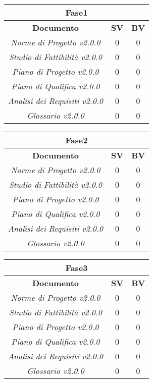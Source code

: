 \begin{center}

\begin{tabular}{|c|c|c|}
\toprule
\multicolumn{3}{c}{\textbf{Fase1}} \\
\hline
\textbf{Documento} & \textbf{SV} & \textbf{BV} \\ 
\hline
\textit{Norme di Progetto v2.0.0} & 0 & 0 \\ 
\textit{Studio di Fattibilità v2.0.0} & 0 & 0 \\ 
\textit{Piano di Progetto v2.0.0} & 0 & 0 \\ 
\textit{Piano di Qualifica v2.0.0} & 0 & 0 \\ 
\textit{Analisi dei Requisiti v2.0.0} & 0 & 0 \\ 
\textit{Glossario v2.0.0} & 0 & 0 \\ 
\hline
\end{tabular}
\end{center}
\vspace{3mm}
\begin{center}
\begin{tabular}{|c|c|c|}
\toprule
\multicolumn{3}{c}{\textbf{Fase2}} \\
\hline 
\textbf{Documento} & \textbf{SV} & \textbf{BV} \\ 
\hline
\textit{Norme di Progetto v2.0.0} & 0 & 0 \\ 
\textit{Studio di Fattibilità v2.0.0} & 0 & 0 \\ 
\textit{Piano di Progetto v2.0.0} & 0 & 0 \\ 
\textit{Piano di Qualifica v2.0.0} & 0 & 0 \\ 
\textit{Analisi dei Requisiti v2.0.0} & 0 & 0 \\ 
\textit{Glossario v2.0.0} & 0 & 0 \\ 
\hline
\end{tabular}
\end{center}
\vspace{3mm}
\begin{center}
\begin{tabular}{|c|c|c|}
\toprule
\multicolumn{3}{c}{\textbf{Fase3}} \\
\hline
\textbf{Documento} & \textbf{SV} & \textbf{BV} \\ 
\hline
\textit{Norme di Progetto v2.0.0} & 0 & 0 \\ 
\textit{Studio di Fattibilità v2.0.0} & 0 & 0 \\ 
\textit{Piano di Progetto v2.0.0} & 0 & 0 \\ 
\textit{Piano di Qualifica v2.0.0} & 0 & 0 \\ 
\textit{Analisi dei Requisiti v2.0.0} & 0 & 0 \\ 
\textit{Glossario v2.0.0} & 0 & 0 \\ 
\hline
\end{tabular}
\end{center}
